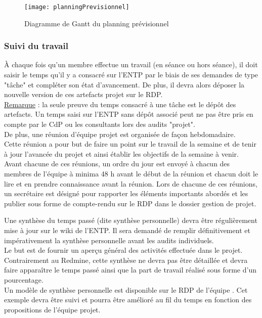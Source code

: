 \documentclass[a4paper,11pt,titlepage]{article}
\newcounter{subsubsubsection}[subsubsection]
\begin{document}
\begin{figure}[H]
    \centering
    \texttt{[image: planningPrevisionnel]}
    \caption{Diagramme de Gantt du planning prévisionnel}
\end{figure}

\subsubsection{Suivi du travail}
À chaque fois qu'un membre effectue un travail (en séance ou hors séance),
il doit saisir le temps qu'il y a consacré sur l'ENTP par le biais de
ses demandes de type "tâche" et compléter son état d'avancement.
De plus, il devra alors déposer la nouvelle version de ces
artefacts projet sur le RDP.\\
\underline{Remarque} : la seule preuve du temps consacré à une tâche est le dépôt
des artefacts. Un temps saisi sur l'ENTP sans dépôt associé peut ne
pas être pris en compte par le CdP ou les consultants lors des audits
"projet".\\
De plus, une réunion d'équipe projet est organisée de façon hebdomadaire.\\
Cette réunion a pour but de faire un point sur le travail de la semaine et de tenir à jour l'avancée du projet et ainsi établir les objectifs
de la semaine à venir. Avant chacune de ces réunions, un ordre du jour est
envoyé à chacun des membres de l'équipe à minima 48 h avant le début de la
réunion et chacun doit le lire et en prendre connaissance avant la réunion.
Lors de chacune de ces réunions, un secrétaire est désigné pour rapporter
les éléments importants abordés et les publier sous forme de compte-rendu
sur le RDP dans le dossier gestion de projet.

Une synthèse du temps passé (dite synthèse personnelle) devra être
régulièrement mise à jour sur le wiki de l'ENTP. Il sera demandé de
remplir définitivement et impérativement la synthèse personnelle
avant les audits individuels.\\

Le but est de fournir un aperçu général des activités effectuée dans
le projet. Contrairement au Redmine, cette synthèse ne devra pas être détaillée
et devra faire apparaître le temps passé ainsi que la part de travail réalisé sous
forme d'un pourcentage. \\

Un modèle de synthèse personnelle est disponible sur le RDP de l'équipe {\teamNumber} \cite[Modèle fiche synthèse]{SYNTH}. 
Cet exemple devra être suivi et pourra être amélioré au fil du temps en fonction des propositions de l'équipe projet.
\end{document}
